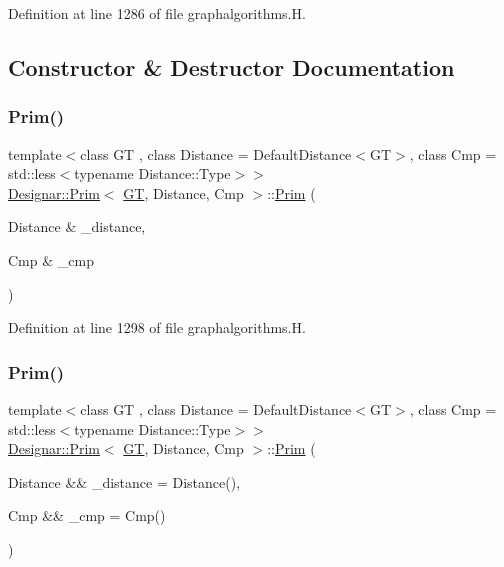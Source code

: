 Definition at line 1286 of file graphalgorithms.\+H.



\subsection{Constructor \& Destructor Documentation}
\mbox{\label{class_designar_1_1_prim_a72499b6f863776f135b39977e8c981bf}} 
\subsubsection{\texorpdfstring{Prim()}{Prim()}\hspace{0.1cm}{\footnotesize\ttfamily [1/2]}}
{\footnotesize\ttfamily template$<$class GT , class Distance  = Default\+Distance$<$\+G\+T$>$, class Cmp  = std\+::less$<$typename Distance\+::\+Type$>$$>$ \\
\hyperlink{class_designar_1_1_prim}{Designar\+::\+Prim}$<$ \hyperlink{demo-buildgraph_8_c_a3001c40d2c31ca87ed96cd7d1334a55e}{GT}, Distance, Cmp $>$\+::\hyperlink{class_designar_1_1_prim}{Prim} (\begin{DoxyParamCaption}\item[{Distance \&}]{\+\_\+distance,  }\item[{Cmp \&}]{\+\_\+cmp }\end{DoxyParamCaption})\hspace{0.3cm}{\ttfamily [inline]}}



Definition at line 1298 of file graphalgorithms.\+H.

\mbox{\label{class_designar_1_1_prim_abf866c064ed21f9be1ccb60ed9df84c1}} 
\subsubsection{\texorpdfstring{Prim()}{Prim()}\hspace{0.1cm}{\footnotesize\ttfamily [2/2]}}
{\footnotesize\ttfamily template$<$class GT , class Distance  = Default\+Distance$<$\+G\+T$>$, class Cmp  = std\+::less$<$typename Distance\+::\+Type$>$$>$ \\
\hyperlink{class_designar_1_1_prim}{Designar\+::\+Prim}$<$ \hyperlink{demo-buildgraph_8_c_a3001c40d2c31ca87ed96cd7d1334a55e}{GT}, Distance, Cmp $>$\+::\hyperlink{class_designar_1_1_prim}{Prim} (\begin{DoxyParamCaption}\item[{Distance \&\&}]{\+\_\+distance = {\ttfamily Distance()},  }\item[{Cmp \&\&}]{\+\_\+cmp = {\ttfamily Cmp()} }\end{DoxyParamCaption})\hspace{0.3cm}{\ttfamily [inline]}}



